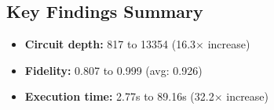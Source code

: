 \documentclass{article}
\begin{document}
\vspace{1em}

\subsection*{Key Findings Summary}

\begin{itemize}
    \item \textbf{Circuit depth:} 817 to 13354 (16.3$\times$ increase)
    \item \textbf{Fidelity:} 0.807 to 0.999 (avg: 0.926)
    \item \textbf{Execution time:} 2.77s to 89.16s (32.2$\times$ increase)
\end{itemize}
\end{document}
